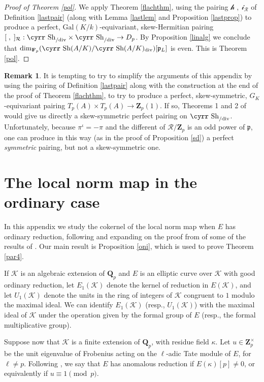 \documentclass[reqno]{amsart}
\theoremstyle{definition}
\newtheorem{rem}[thm]{Remark}
\def\Sh{\mbox{\cyrr Sh}}
\def\Z{\mathbf{Z}}
\def\Q{\mathbf{Q}}
\def\F{\mathbf{F}}
\def\Zp{\Z_p}
\def\Qp{\Q_p}
\def\Fp{\F_p}
\def\cR{\mathcal{R}}
\def\K{\mathcal{K}}
\def\ld{\mathcal{h}}
\def\rd{\mathcal{i}}
\def\p{\mathfrak{p}}
\def\P{\mathfrak{p}}
\def\Gal{\mathrm{Gal}}
\def\div{\mathrm{div}}
\def\Shmd{\Sh_{/\div}}
\def\k{k}
\def\rf{\Fp}
\def\Dp{D_p}
\def\pair#1#2{\ld#1,#2\rd}
\def\spair#1#2{[#1,#2]}
\begin{document}
\begin{proof}[Proof of Theorem \ref{pol}]
We apply Theorem \ref{flachthm}, 
using the pairing $\pair{\;}{\;}_\cR$ of Definition \ref{lastpair} 
(along with Lemma \ref{lastlem} and Proposition \ref{lastprop}) 
to produce a perfect, $\Gal(K/\k)$-equivariant, 
skew-Hermitian pairing 
$\spair{\;}{\;}_\cR : \Shmd \times \Shmd \to \Dp$.
By Proposition \ref{linalg} we conclude that 
$\dim_{\rf}(\Sh(A/K)/\Sh(A/K)_\div)[\P_L]$ is even.  This is 
Theorem \ref{pol}.
\end{proof}

\begin{rem}
It is tempting to try to simplify the arguments of this appendix by 
using the pairing of Definition \ref{lastpair} along with the construction 
at the end of the proof of Theorem \ref{flachthm}, to try to produce a perfect, 
skew-symmetric, $G_K$-equivariant pairing $T_p(A) \times T_p(A) \to \Zp(1)$.  
If so, Theorems 1 and 2 of \cite{flach} would give us directly a skew-symmetric 
perfect pairing on $\Shmd$.  Unfortunately, because $\pi^\iota = -\pi$ and 
the different of $\cR/\Zp$ is an odd power of $\p$, one can produce 
in this way (as in the proof of Proposition \ref{sd}) 
a perfect {\em symmetric} pairing, but not a skew-symmetric one.
\end{rem}

\section{The local norm map in the ordinary case}
\label{appb}

In this appendix we  study the cokernel of the local norm map when 
$E$ has ordinary reduction, following and expanding on the proof from
\cite{luro} of some of the results of \cite{mazurav}.  
Our main result is 
Proposition \ref{oni}, which is used to prove Theorem \ref{par4}.

If $\K$ is an algebraic extension of $\Qp$ and $E$ is an elliptic curve 
over $\K$ with good ordinary reduction,
let $E_1(\K)$ denote the kernel of reduction in $E(\K)$, and 
let $U_1(\K)$ denote the units in the ring of integers of $\K$ 
congruent to $1$ modulo the maximal ideal.
We can identify $E_1(\K)$ (resp., $U_1(\K)$) with the maximal ideal 
of $\K$ under the operation given by the formal group of $E$ 
(resp., the formal multiplicative group).  

Suppose now that $\K$ is a finite extension of $\Qp$, with residue 
field $\kappa$.  
Let $u \in \Zp^\times$ be the unit eigenvalue of Frobenius 
acting on the $\ell$-adic Tate module of $E$, for $\ell \ne p$.  
Following \cite{mazurav}, 
we say that $E$ has anomalous reduction if $E(\kappa)[p] \ne 0$, 
or equivalently if $u \equiv 1 \pmod{p}$.  
\end{document}

